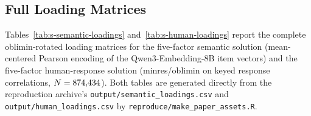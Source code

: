 \subsection{Full Loading Matrices}

Tables~\ref{tab:s-semantic-loadings} and~\ref{tab:s-human-loadings} report
the complete oblimin-rotated loading matrices for the five-factor semantic
solution (mean-centered Pearson encoding of the Qwen3-Embedding-8B item
vectors) and the five-factor human-response solution
(minres/oblimin on keyed response correlations, $N = 874{,}434$).
Both tables are generated directly from the reproduction archive's
\texttt{output/semantic\_loadings.csv} and
\texttt{output/human\_loadings.csv} by
\texttt{reproduce/make\_paper\_assets.R}.




